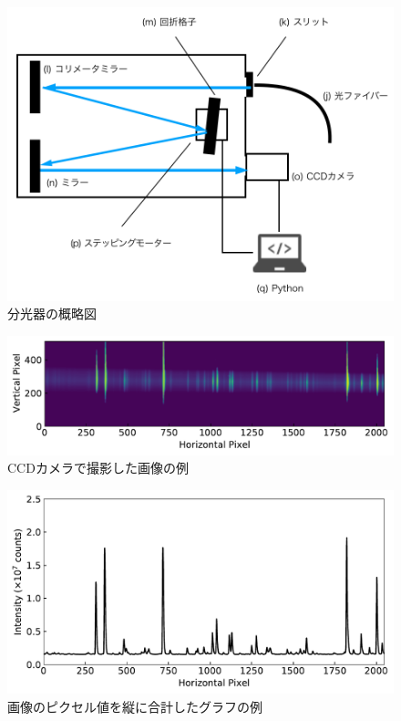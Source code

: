 \begin{figure}
    \centering
    \includegraphics[width=15cm]{pictures/spectrometer-picture.png}
    \caption{分光器の概略図}
    \label{fig:spectrometer-picture}
\end{figure}

\begin{figure}
    \centering
    \includegraphics[width=15cm]{pictures/picture-example.pdf}
    \caption{CCDカメラで撮影した画像の例}
    \label{fig:picture-example}
\end{figure}

\begin{figure}
    \centering
    \includegraphics[width=15cm]{pictures/spectrum-example.pdf}
    \caption{画像のピクセル値を縦に合計したグラフの例}
    \label{fig:spectrum-example}
\end{figure}

